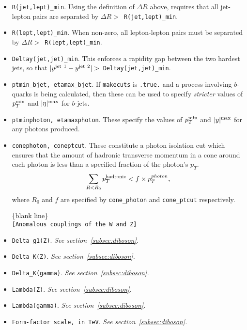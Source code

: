 \documentclass[12pt]{article}
\begin{document}
\begin{itemize}
\item {\tt R(jet,lept)\_min}. Using the definition of $\Delta R$ above,
requires that all jet-lepton pairs are separated by
$\Delta R >$~{\tt R(jet,lept)\_min}.

\item {\tt R(lept,lept)\_min}. When non-zero, all lepton-lepton pairs
must be separated by $\Delta R >$~{\tt R(lept,lept)\_min}.

\item {\tt Deltay(jet,jet)\_min}. This enforces a rapidity gap between
the two hardest jets, so that
$|y^{\rm jet~1} - y^{\rm jet~2}| >$~{\tt Deltay(jet,jet)\_min}.

\item {\tt ptmin\_bjet,  etamax\_bjet}. If {\tt makecuts} is {\tt .true.}
and a process involving $b$-quarks is being calculated, then these can
be used to specify {\em stricter} values of $p_T^{\rm min}$
and $|\eta|^{\rm max}$ for $b$-jets.

\item {\tt ptminphoton, etamaxphoton}. These specify the values
of $p_T^{\rm min}$ and $|y|^{\rm max}$ for any photons produced.

\item {\tt conephoton, coneptcut}. These constitute a photon isolation
cut which ensures that the amount of hadronic
transverse momentum in a cone around each photon is less than
a specified fraction of the photon's $p_T$.
\begin{displaymath}
\sum_{R < R_0} p_T^{\rm hadronic} < f \times p_T^{photon},
\end{displaymath}
where $R_0$ and $f$ are specified by {\tt cone\_photon} and
{\tt cone\_ptcut} respectively.

\begin{center}
\{blank line\} \\
{\tt [Anomalous couplings of the W and Z] }
\end{center}

\item {\tt Delta\_g1(Z)}. {\it See section~\ref{subsec:diboson}.}
\item {\tt Delta\_K(Z)}. {\it See section~\ref{subsec:diboson}.}
\item {\tt Delta\_K(gamma)}. {\it See section~\ref{subsec:diboson}.}
\item {\tt Lambda(Z)}. {\it See section~\ref{subsec:diboson}.}
\item {\tt Lambda(gamma)}. {\it See section~\ref{subsec:diboson}.}
\item {\tt Form-factor scale, in TeV}. {\it See section~\ref{subsec:diboson}.}


\end{itemize}
\end{document}
